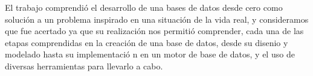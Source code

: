 
El trabajo comprendi\'o el desarrollo de una bases de datos desde cero como soluci\'on a un problema inspirado en una situaci\'on de la vida real, y consideramos que fue acertado ya que su realizaci\'on nos permiti\'o comprender, cada una de las etapas comprendidas en la creaci\'on de una base de datos, desde su disenio y modelado hasta su implementaci\'o n en un motor de base de datos, y el uso de diversas herramientas para llevarlo a cabo.